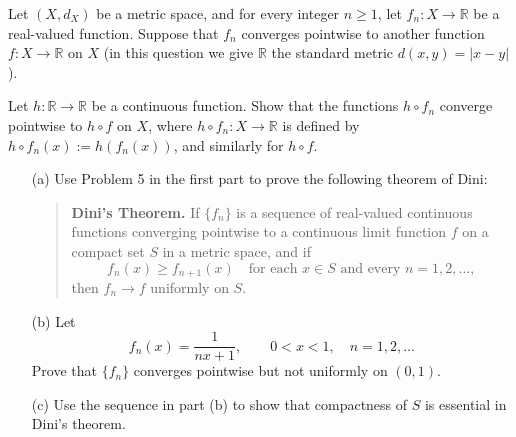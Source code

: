 \documentclass[addpoints]{exam}
\theoremstyle{definition}
\begin{document}
\begin{CJK*}{UTF8}{gbsn}
\begin{questions}
\begin{solution}
\end{solution}

\question Let $(X,d_X)$ be a metric space, and for every integer $n \ge 1$, let $f_n : X \to \mathbb{R}$ be a real-valued function. Suppose that $f_n$ converges pointwise to another function $f : X \to \mathbb{R}$ on $X$ (in this question we give $\mathbb{R}$ the standard metric $d(x,y) = |x - y|$). 

Let $h:\mathbb{R}\to\mathbb{R}$ be a continuous function. Show that the functions $h \circ f_n$ converge pointwise to $h \circ f$ on $X$, where $h \circ f_n : X \to \mathbb{R}$ is defined by $h \circ f_n(x) := h(f_n(x))$, and similarly for $h \circ f$.


\begin{solution}

\end{solution}

\question \begin{enumerate}
  \item[(a)] Use Problem 5 in the first part to prove the following theorem of Dini:

  \begin{quote}
  \textbf{Dini's Theorem.}  
  If $\{f_n\}$ is a sequence of real-valued continuous functions converging pointwise to a continuous limit function $f$ on a compact set $S$ in a metric space, and if 
  \[
  f_n(x) \ge f_{n+1}(x)
  \quad \text{for each } x \in S \text{ and every } n = 1, 2, \dots,
  \]
  then $f_n \to f$ uniformly on $S$.
  \end{quote}

  \item[(b)]  Let 
  \[
  f_n(x) = \frac{1}{n x + 1}, \qquad 0 < x < 1, \quad n = 1, 2, \dots
  \]
  Prove that $\{f_n\}$ converges pointwise but not uniformly on $(0,1)$.

  \item[(c)]  Use the sequence in part (b) to show that compactness of $S$ is essential in Dini's theorem.
\end{enumerate}

\begin{solution}

\end{solution}


\end{questions}


%
\end{CJK*}
\end{document}
